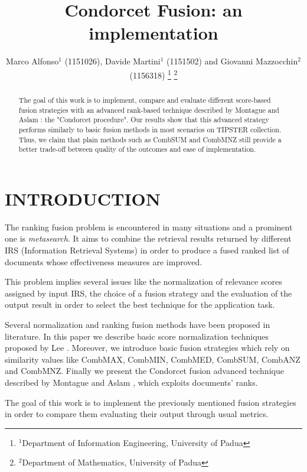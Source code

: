 \documentclass[letterpaper, 10 pt, conference]{ieeeconf}  %
\title{\LARGE \bf
Condorcet Fusion: an implementation
}
\author{Marco Alfonso$^{1}$ (1151026), Davide Martini$^{1}$ (1151502) and Giovanni Mazzocchin$^{2}$ (1156318)%
\thanks{$^{1}$Department of Information Engineering, University of Padua
        }%
\thanks{$^{2}$Department of Mathematics, University of Padua}
}%
\begin{document}
\maketitle
\thispagestyle{empty}
\pagestyle{empty}


\begin{abstract}

The goal of this work is to implement, compare and evaluate different score-based fusion strategies with an advanced rank-based technique described by Montague and Aslam \cite{c1}: the "Condorcet procedure".
Our results show that this advanced strategy
performs similarly to basic fusion methods in most scenarios on TIPSTER collection.
Thus, we claim that plain methods such as CombSUM and CombMNZ still provide a better trade-off between quality of the outcomes and ease of implementation.

\end{abstract}


\section{INTRODUCTION}
The ranking fusion problem is encountered in many situations and a prominent one is \textit{metasearch}. It aims to combine the retrieval results returned by different IRS (Information Retrieval Systems) in order to produce a fused ranked list of documents whose effectiveness measures are improved. 

This problem implies several issues like the normalization of relevance scores assigned by input IRS, the choice of a fusion strategy and the evaluation of the output result in order to select the best technique for the application task.

Several normalization and ranking fusion methods have been proposed in literature. In this paper we describe basic score normalization techniques proposed by Lee \cite{c3}. Moreover, we introduce basic fusion strategies which rely on similarity values like CombMAX, CombMIN, CombMED, CombSUM, CombANZ and CombMNZ. Finally we present the Condorcet fusion advanced technique described by Montague and Aslam \cite{c1}, which exploits documents' ranks.

The goal of this work is to implement the previously mentioned fusion strategies in order to compare them evaluating their output through usual metrics.
\end{document}
